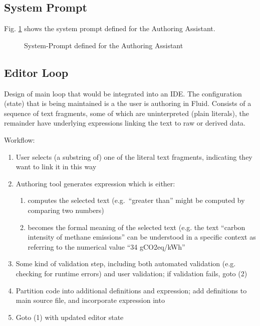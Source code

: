 \subsection{System Prompt}
\label{subsec:system-prompt}
Fig. \ref{fig:system-prompt} shows the system prompt defined for the Authoring Assistant.

\begin{figure}[h]
    \centering
    \begin{tcolorbox}[colback=gray!10, colframe=gray!50, boxrule=0.5pt, arc=2pt,
        left=6pt, right=6pt, top=4pt, bottom=4pt]
    \end{tcolorbox}
    \vspace{-0.5em}
    \caption{System-Prompt defined for the Authoring Assistant}
    \label{fig:system-prompt}
\end{figure}


\subsection{Editor Loop}
\label{subsec:editor-loop}
Design of main loop that would be integrated into an IDE. The configuration (state) that is being maintained
is a  the user is authoring in Fluid. Consists of a sequence of text fragments, some of which
are uninterpreted (plain literals), the remainder have underlying expressions linking the text to raw or derived
data.

Workflow:
\begin{enumerate}
\item User selects (a substring of) one of the literal text fragments, indicating they want to link it in this
way
\item Authoring tool generates expression which is either:
  \begin{enumerate}
  \item computes the selected text (e.g.~``greater than'' might be computed by comparing two numbers)
  \item becomes the formal meaning of the selected text (e.g. the text ``carbon intensity of methane
emissions'' can be understood in a specific context as referring to the numerical value ``34 gCO2eq/kWh''
  \end{enumerate}
\item Some kind of validation step, including both automated validation (e.g. checking for runtime errors) and
user validation; if validation fails, goto (2)
\item Partition code into additional definitions and expression; add definitions to main source file, and
incorporate expression into 
\item Goto (1) with updated editor state
\end{enumerate}

